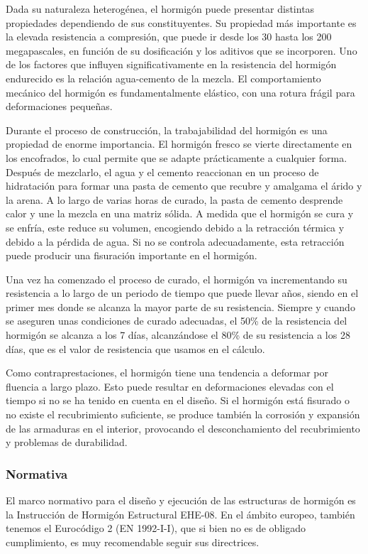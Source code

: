Dada su naturaleza heterogénea, el hormigón puede presentar distintas propiedades dependiendo de sus constituyentes. Su propiedad más importante es la elevada resistencia a compresión, que puede ir desde los 30 hasta los 200 megapascales, en función de su dosificación y los aditivos que se incorporen. Uno de los factores que influyen significativamente en la resistencia del hormigón endurecido es la relación agua-cemento de la mezcla. El comportamiento mecánico del hormigón es fundamentalmente elástico, con una rotura frágil para deformaciones pequeñas.

Durante el proceso de construcción, la trabajabilidad del hormigón es una propiedad de enorme importancia. El hormigón fresco se vierte directamente en los encofrados, lo cual permite que se adapte prácticamente a cualquier forma. Después de mezclarlo, el agua y el cemento reaccionan en un proceso de hidratación para formar una pasta de cemento que recubre y amalgama el árido y la arena. A lo largo de varias horas de curado, la pasta de cemento desprende calor y une la mezcla en una matriz sólida. A medida que el hormigón se cura y se enfría, este reduce su volumen, encogiendo debido a la retracción térmica y debido a la pérdida de agua. Si no se controla adecuadamente, esta retracción puede producir una fisuración importante en el hormigón.

Una vez ha comenzado el proceso de curado, el hormigón va incrementando su resistencia a lo largo de un periodo de tiempo que puede llevar años, siendo en el primer mes donde se alcanza la mayor parte de su resistencia. Siempre y cuando se aseguren unas condiciones de curado adecuadas, el 50\% de la resistencia del hormigón se alcanza a los 7 días, alcanzándose el 80\% de su resistencia a los 28 días, que es el valor de resistencia que usamos en el cálculo.

Como contraprestaciones, el hormigón tiene una tendencia a deformar por fluencia a largo plazo. Esto puede resultar en deformaciones elevadas con el tiempo si no se ha tenido en cuenta en el diseño. Si el hormigón está fisurado o no existe el recubrimiento suficiente, se produce también la corrosión y expansión de las armaduras en el interior, provocando el desconchamiento del recubrimiento y problemas de durabilidad.

\subsubsection*{Normativa}

El marco normativo para el diseño y ejecución de las estructuras de hormigón es la Instrucción de Hormigón Estructural EHE-08. En el ámbito europeo, también tenemos el Eurocódigo 2 (EN 1992-I-I), que si bien no es de obligado cumplimiento, es muy recomendable seguir sus directrices.

